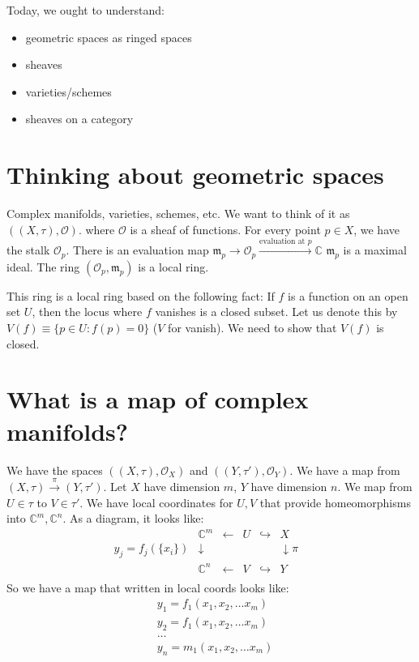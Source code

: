 \documentclass{book}
\newcommand{\C}{\ensuremath{\mathbb{C}}}
\renewcommand{\O}{\ensuremath{\mathcal{O}}}
\newcommand{\m}{\mathfrak{m}}
\theoremstyle{definition}
\begin{document}
Today, we ought to understand:
\begin{itemize}
    \item geometric spaces as ringed spaces
    \item sheaves
    \item varieties/schemes
    \item sheaves on a category
\end{itemize}

\section{Thinking about geometric spaces}


Complex manifolds, varieties, schemes, etc. We want to think of it as $((X, \tau), \O)$.
where $\O$ is a sheaf of functions. For every point $p \in X$, we have the stalk $\O_p$.
There is an evaluation map $\m_p \rightarrow \O_p \xrightarrow{\text{evaluation at $p$}} \mathbb C$
$\m_p$ is a maximal ideal. The ring $(\O_p, \m_p)$ is a local ring.

This ring is a local ring based on the following fact: If $f$ is a function on
an open set $U$, then the locus where $f$ vanishes is a closed subset. Let us
denote this by $V(f) \equiv \{ p \in U : f(p) = 0 \}$ ($V$ for vanish). We need
to show that $V(f)$ is closed. 


\section{What is a map of complex manifolds?}
We have the spaces $((X, \tau), \O_X)$ and $((Y, \tau'), \O_Y)$.
We have a map from $(X, \tau) \xrightarrow{\pi} (Y, \tau')$. Let $X$ have
dimension $m$, $Y$ have dimension $n$.  
We map from $U \in \tau$ to $V \in \tau'$. We have local coordinates for $U, V$
that provide homeomorphisms into $\C^m, \C^n$. As a diagram,
it looks like:
\[
\begin{matrix}
    & \C^m &\leftarrow & U & \hookrightarrow& X& \\
     y_j = f_j(\{x_i\})   & \downarrow      &   &   & &\downarrow \pi \\
    &\C^n &\leftarrow & V & \hookrightarrow& Y& \\
\end{matrix}
\]
So we have a map that written in local coords looks like:
\begin{align*}
    &y_1 = f_1(x_1, x_2, \dots x_m) \\
    &y_2 = f_1(x_1, x_2, \dots x_m) \\
    &\dots \\
    &y_n = m_1(x_1, x_2, \dots x_m) \\
\end{align*}
\end{document}
